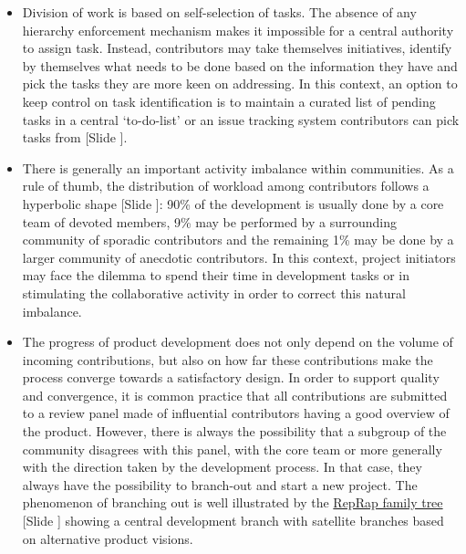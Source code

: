 \documentclass{article}
\newcounter{slide}
\begin{document}
\begin{itemize}
	\item Division of work is based on self-selection of tasks. The absence of any hierarchy enforcement mechanism makes it impossible for a central authority to assign task. Instead, contributors may take themselves initiatives, identify by themselves what needs to be done based on the information they have and pick the tasks they are more keen on addressing. In this context, an option to keep control on task identification is to maintain a curated list of pending tasks in a central `to-do-list' or an issue tracking system contributors can pick tasks from {\color{blue}[Slide ]}.
	\item There is generally an important activity imbalance within communities. As a rule of thumb, the distribution of workload among contributors follows a hyperbolic shape {\color{blue}[Slide ]}: 90\% of the development is usually done by a core team of devoted members, 9\% may be performed by a surrounding community of sporadic contributors and the remaining 1\% may be done by a larger community of anecdotic contributors. In this context, project initiators may face the dilemma to spend their time in development tasks or in stimulating the collaborative activity in order to correct this natural imbalance.	
	\item The progress of product development does not only depend on the volume of incoming contributions, but also on how far these contributions make the process converge towards a satisfactory design. In order to support quality and convergence, it is common practice that all contributions are submitted to a review panel made of influential contributors having a good overview of the product. However, there is always the possibility that a subgroup of the community disagrees with this panel, with the core team or more generally with the direction taken by the development process. In that case, they always have the possibility to branch-out and start a new project. The phenomenon of branching out is well illustrated by the \href{https://makezine.com/2015/12/02/a-reprap-family-tree-tracking-the-printers-that-started-it-all/}{RepRap family tree} {\color{blue}[Slide ]} showing a central development branch with satellite branches based on alternative product visions.
\end{itemize}

\bigskip
\end{document}
